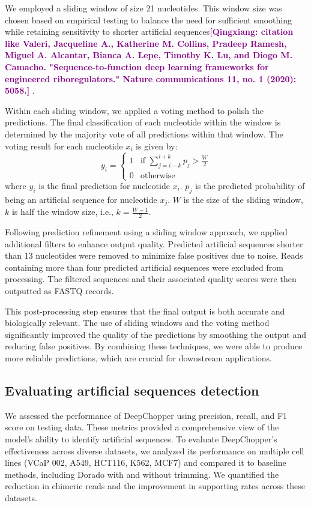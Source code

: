 \documentclass[pdflatex, sn-mathphys-num, lineno]{sn-jnl}%
\newcommand{\qx}[1]{\textcolor{purple}{\textbf{[Qingxiang: #1]}}}
\theoremstyle{thmstyleone}%
\theoremstyle{thmstyletwo}%
\theoremstyle{thmstylethree}%
\begin{document}
We employed a sliding window of size 21 nucleotides.
This window size was chosen based on empirical testing to balance the need for sufficient smoothing while retaining sensitivity to shorter artificial sequences\qx{citation like Valeri, Jacqueline A., Katherine M. Collins, Pradeep Ramesh, Miguel A. Alcantar, Bianca A. Lepe, Timothy K. Lu, and Diogo M. Camacho. "Sequence-to-function deep learning frameworks for engineered riboregulators." Nature communications 11, no. 1 (2020): 5058.} .

Within each sliding window, we applied a voting method to polish the predictions.
The final classification of each nucleotide within the window is determined by the majority vote of all predictions within that window.
The voting result for each nucleotide \( x_i \) is given by:
\[
	y_i = \begin{cases}
		1 & \text{if } \sum_{j=i-k}^{i+k} p_j > \frac{W}{2} \\
		0 & \text{otherwise}
	\end{cases}
\]
where \( y_i \) is the final prediction for nucleotide \( x_i \). \( p_j \) is the predicted probability of being an artificial sequence for nucleotide \( x_j \). \( W \) is the size of the sliding window, \( k \) is half the window size, i.e., \( k = \frac{W-1}{2} \).

Following prediction refinement using a sliding window approach, we applied additional filters to enhance output quality.
Predicted artificial sequences shorter than 13 nucleotides were removed to minimize false positives due to noise.
Reads containing more than four predicted artificial sequences were excluded from processing.
The filtered sequences and their associated quality scores were then outputted as FASTQ records.

This post-processing step ensures that the final output is both accurate and biologically relevant.
The use of sliding windows and the voting method significantly improved the quality of the predictions by smoothing the output and reducing false positives.
By combining these techniques, we were able to produce more reliable predictions, which are crucial for downstream applications.


\subsection{Evaluating artificial sequences detection}

We assessed the performance of DeepChopper using precision, recall, and F1 score on testing data.
These metrics provided a comprehensive view of the model's ability to identify artificial sequences.
To evaluate DeepChopper's effectiveness across diverse datasets, we analyzed its performance on multiple cell lines (VCaP 002, A549, HCT116, K562, MCF7) and compared it to baseline methods, including Dorado with and without trimming.
We quantified the reduction in chimeric reads and the improvement in supporting rates across these datasets.
\end{document}
